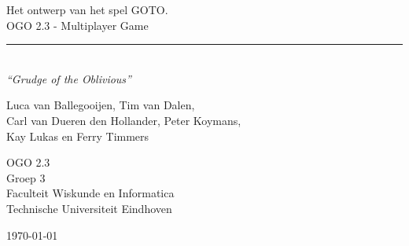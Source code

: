 \begin{titlepage}
	\begin{center}
		
		{\Huge Het ontwerp van het spel \textsc{GOTO}. \\[0.5cm]OGO 2.3 - Multiplayer Game}\\[0.5cm]
		\rule{\linewidth}{0.5mm}\\[0.5cm]
				\bigskip
		\huge \textit{``Grudge of the Oblivious''}
		
		{\Large
		Luca van Ballegooijen, Tim van Dalen, \\
		Carl van Dueren den Hollander, Peter Koymans,\\
		Kay Lukas en Ferry Timmers\\[1cm]
		}
		
		{\large
		OGO 2.3\\
		Groep 3 \\[1cm]
		Faculteit Wiskunde en Informatica\\
		Technische Universiteit Eindhoven\\[1cm]
		}
		
		

		\vfill

		{\large \today}
	\end{center}
\end{titlepage}
